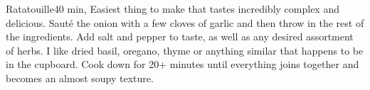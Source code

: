 \begin{recipe}{Ratatouille}{}{40 min, }
\freeform Easiest thing to make that tastes incredibly complex and delicious.
Sauté the onion with a few cloves of garlic and then throw in the rest of the ingredients. Add salt and pepper to taste, as well as any desired assortment of herbs. I like dried basil, oregano, thyme or anything similar that happens to be in the cupboard. Cook down for 20+ minutes until everything joins together and becomes an almost soupy texture.
\end{recipe}
